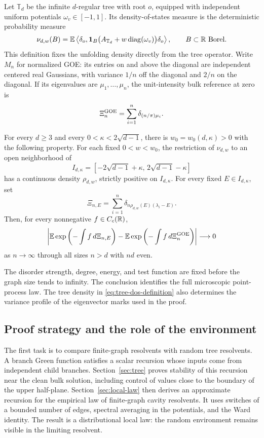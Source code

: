 Let $\mathbb T_d$ be the infinite $d$-regular tree with root $o$, equipped
with independent uniform potentials $\omega_v\in[-1,1]$.  Its density-of-states
measure is the deterministic probability measure
\begin{equation}\label{eq:tree-dos-definition}
 \nu_{d,w}(B)=
 \mathbb E\left\langle\delta_o,
 \mathbf1_B\bigl(A_{\mathbb T_d}+w\operatorname{diag}(\omega_v)\bigr)\delta_o
 \right\rangle,
 \qquad B\subset\mathbb R\ \text{Borel}.
\end{equation}
This definition fixes the unfolding density directly from the tree
operator.  Write $M_n$ for normalized GOE: its entries on and above
the diagonal are independent centered real Gaussians, with variance
$1/n$ off the diagonal and $2/n$ on the diagonal.  If its eigenvalues
are $\mu_1,\ldots,\mu_n$, the unit-intensity bulk reference at zero is
\[
 \Xi_n^{\mathrm{GOE}}=\sum_{i=1}^n\delta_{(n/\pi)\mu_i}.
\]

\begin{theorem}\label{thm:main}
For every $d\ge3$ and every $0<\kappa<2\sqrt{d-1}$, there is
$w_0=w_0(d,\kappa)>0$ with the following property.  For each fixed
$0<w<w_0$, the restriction of $\nu_{d,w}$ to an open neighborhood of
\[
 I_{d,\kappa}=[-2\sqrt{d-1}+\kappa,\,2\sqrt{d-1}-\kappa]
\]
has a continuous density $\rho_{d,w}$, strictly positive on
$I_{d,\kappa}$.  For every fixed $E\in I_{d,\kappa}$, set
\[
 \Xi_{n,E}=\sum_{i=1}^n
       \delta_{n\rho_{d,w}(E)(\lambda_i-E)}.
\]
Then, for every nonnegative $f\in C_c(\mathbb R)$,
\begin{equation}\label{eq:main-laplace}
 \left|
 \mathbb E\exp\left(-\int f\,d\Xi_{n,E}\right)
 -\mathbb E\exp\left(-\int f\,d\Xi_n^{\mathrm{GOE}}\right)
 \right|\longrightarrow0
\end{equation}
as $n\to\infty$ through all sizes $n>d$ with $nd$ even.
\end{theorem}

The disorder strength, degree, energy, and test function are fixed before
the graph size tends to infinity.  The conclusion identifies the full
microscopic point-process law.  The tree density in
\eqref{eq:tree-dos-definition} also determines the variance profile of
the eigenvector marks used in the proof.

\subsection{Proof strategy and the role of the environment}

The first task is to compare finite-graph resolvents with random tree
resolvents.  A branch Green function satisfies a scalar recursion whose
inputs come from independent child branches.  Section~\ref{sec:tree}
proves stability of this recursion near the clean bulk solution, including
control of values close to the boundary of the upper half-plane.
Section~\ref{sec:local-law} then derives an approximate recursion for
the empirical law of finite-graph cavity resolvents.  It uses switches
of a bounded number of edges, spectral averaging in the potentials, and
the Ward identity.  The result is a distributional local law: the random
environment remains visible in the limiting resolvent.

